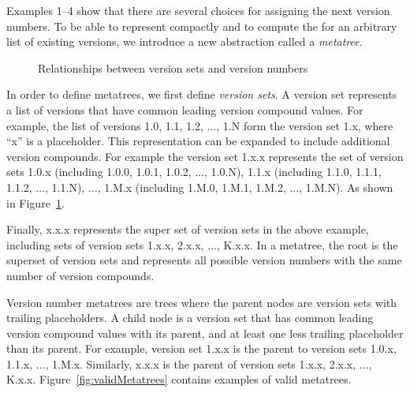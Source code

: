 \documentclass[conference]{IEEEtran}
\begin{document}



Examples 1--4 show that there are several choices for assigning the next version numbers. To be able to represent compactly and to compute the \numberchoices for an arbitrary list of existing versions, we introduce a new abstraction called a \emph{metatree}. 



\begin{figure}
\begin{center}

\end{center}
\caption{Relationships between version sets and version numbers}
\label{fig:diaVersionSet}
\end{figure}

In order to define metatrees, we first define \emph{version sets}.
A version set represents a list of versions that have common leading version compound values. For example, the list of versions 1.0, 1.1, 1.2, $\dots$, 1.N 
form the version set 1.x, where ``x'' is a placeholder.
This representation can be expanded to include additional version compounds. 
For example the version set 1.x.x represents the set of version sets 1.0.x (including 1.0.0, 1.0.1, 1.0.2, $\dots$, 1.0.N), 1.1.x (including 1.1.0, 1.1.1, 1.1.2, $\dots$, 1.1.N),  $\dots$, 1.M.x (including 1.M.0, 1.M.1, 1.M.2, $\dots$, 1.M.N). As shown in Figure~\ref{fig:diaVersionSet}.

Finally, x.x.x represents the super set of version sets in the above example, including sets of version sets 1.x.x, 2.x.x, $\dots$, K.x.x.
In a metatree, the root is the superset of version sets and represents all possible version numbers with the same number of version compounds.





Version number metatrees are trees where the parent nodes are version sets with trailing placeholders. A child node is a version set that has common leading version compound values with its parent, and at least one less trailing placeholder than its parent. For example, version set 1.x.x is the parent to version sets 1.0.x, 1.1.x, $\dots$, 1.M.x.  Similarly, x.x.x is the parent of version sets 1.x.x, 2.x.x, $\dots$, K.x.x.  
Figure~\ref{fig:validMetatrees} contains examples of valid metatrees.
\end{document}
